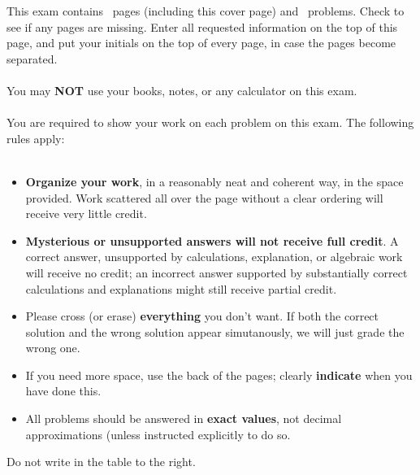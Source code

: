 \documentclass[11pt]{exam}%
\begin{document}
This exam contains \numpages\ pages (including this cover page) and \numquestions\ problems.  Check to see if any pages are missing.  Enter all requested information on the top of this page, and put your initials on the top of every page, in case the pages become separated.\\
\\
You may \textbf{NOT} use your books, notes, or any calculator on this exam.\\
\\
You are required to show your work on each problem on this exam.  The following rules apply:\\
\\
%
\begin{minipage}[t]{3.7in}%
\vspace{0pt}%
\begin{itemize}%
\item%

\textbf{Organize your work}, in a reasonably neat and coherent way, in the space provided. Work scattered all over the page without a clear ordering will receive very little credit.
%
\item%

\textbf{Mysterious or unsupported answers will not receive full credit}. A correct answer, unsupported by calculations, explanation, or algebraic work will receive no credit; an incorrect answer supported by substantially correct calculations and explanations might still receive partial credit.
%
\item%

Please cross (or erase) \textbf{everything} you don't want. If both the correct solution and the wrong solution appear simutanously, we will just grade the wrong one.
%
\item%

If you need more space, use the back of the pages; clearly \textbf{indicate} when you have done this.
%
\item%

All problems should be answered in \textbf{exact values}, not decimal approximations (unless instructed explicitly to do so.%
\end{itemize}%
Do not write in the table to the right.%
\end{minipage}%
\hfill%
\begin{minipage}[t]{2.3in}%
\vspace{0pt}%
%
%
\addpoints%
\gradetable[v]%
\end{minipage}%
\end{document}
